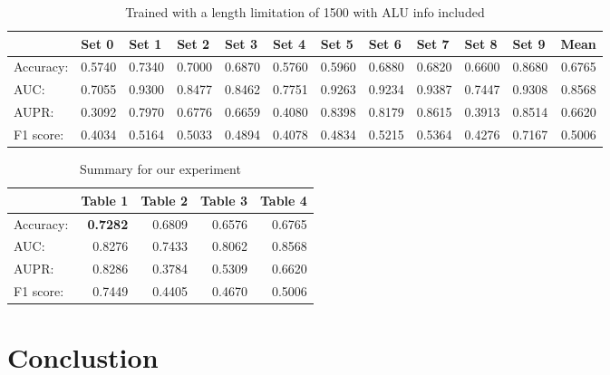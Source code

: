 \documentclass[10pt,a4paper]{article}
\begin{document}
\begin{spacing}{1.5}
\begin{table}[H]
	\centering
	\caption{Trained with a length limitation of 1500 with ALU info included}
	\begin{tabular}{l|rrrrrrrrrr|r}
		& \multicolumn{1}{l}{Set 0} & \multicolumn{1}{l}{Set 1} & \multicolumn{1}{l}{Set 2} & \multicolumn{1}{l}{Set 3} & \multicolumn{1}{l}{Set 4} & \multicolumn{1}{l}{Set 5} & \multicolumn{1}{l}{Set 6} & \multicolumn{1}{l}{Set 7} & \multicolumn{1}{l}{Set 8} & \multicolumn{1}{l}{Set 9} & \multicolumn{1}{l}{Mean} \\ \hline \hline
		Accuracy: & 0.5740  & 0.7340  & 0.7000  & 0.6870  & 0.5760  & 0.5960  & 0.6880  & 0.6820  & 0.6600  & 0.8680  & 0.6765  \\
		AUC:  & 0.7055  & 0.9300  & 0.8477  & 0.8462  & 0.7751  & 0.9263  & 0.9234  & 0.9387  & 0.7447  & 0.9308  & 0.8568  \\
		AUPR: & 0.3092  & 0.7970  & 0.6776  & 0.6659  & 0.4080  & 0.8398  & 0.8179  & 0.8615  & 0.3913  & 0.8514  & 0.6620  \\
		F1 score: & 0.4034  & 0.5164  & 0.5033  & 0.4894  & 0.4078  & 0.4834  & 0.5215  & 0.5364  & 0.4276  & 0.7167  & 0.5006  \\
	\end{tabular}%
	\label{tab:addlabel}%
\end{table}%

\begin{table}[H]
	\centering
	\caption{Summary for our experiment}
	\begin{tabular}{l|r|r|r|r}
		& \multicolumn{1}{l}{Table 1} & \multicolumn{1}{l}{Table 2} & \multicolumn{1}{l}{Table 3} & \multicolumn{1}{l}{Table 4} \\ \hline \hline
		Accuracy: & \textbf{0.7282}  & 0.6809  & 0.6576  & 0.6765  \\
		AUC:  & 0.8276  & 0.7433  & 0.8062  & 0.8568  \\
		AUPR: & 0.8286  & 0.3784  & 0.5309  & 0.6620  \\
		F1 score: & 0.7449  & 0.4405  & 0.4670  & 0.5006  \\
	\end{tabular}%
	\label{tab:addlabel}%
\end{table}%

\section{Conclustion}


\end{spacing}
\end{document}
